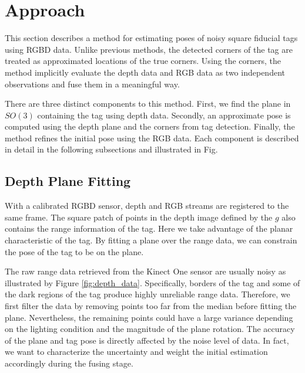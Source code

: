 \section{Approach}
\label{sec:approach}
This section describes a method for estimating poses of noisy square fiducial tags using RGBD data. Unlike previous methods, the detected corners of the tag are treated as approximated locations of the true corners. Using the corners, the method implicitly evaluate the depth data and RGB data as two independent observations and fuse them in a meaningful way.

There are three distinct components to this method. First, we find the plane in $SO(3)$ containing the tag using depth data. Secondly, an approximate pose is computed using the depth plane and the corners from tag detection. Finally, the method refines the initial pose using the RGB data. Each component is described in detail in the following subsections and illustrated in Fig. 

\subsection{Depth Plane Fitting}
With a calibrated RGBD sensor, depth and RGB streams are registered to the same frame. The square patch of points in the depth image defined by the $g$ also contains the range information of the tag. Here we take advantage of the planar characteristic of the tag. By fitting a plane over the range data, we can constrain the pose of the tag to be on the plane.

The raw range data retrieved from the Kinect One sensor are usually noisy as illustrated by Figure \ref{fig:depth_data}. Specifically, borders of the tag and some of the dark regions of the tag produce highly unreliable range data. Therefore, we first filter the data by removing points too far from the median before fitting the plane. Nevertheless, the remaining points could have a large variance depending on the lighting condition and the magnitude of the plane rotation. The accuracy of the plane and tag pose is directly affected by the noise level of data. In fact, we want to characterize the uncertainty and weight the initial estimation accordingly during the fusing stage.


